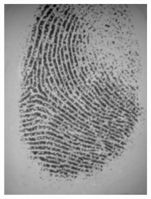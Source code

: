\documentclass{beamer}
\begin{document}
{\begin{figure}[!ht]
\begin{subfigure}[ht]{0.15\textwidth}
            \includegraphics[width=\textwidth]{fingerprints/2004Db4a/1_3_src.jpg}
        \end{subfigure}
        \qquad
        \begin{subfigure}[ht]{0.15\textwidth}

\end{subfigure}
\end{figure}}
\end{document}
